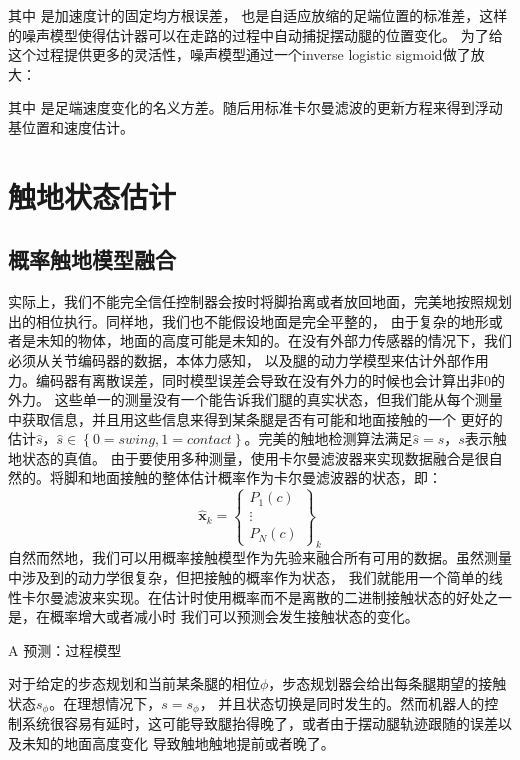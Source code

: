 其中 是加速度计的固定均方根误差， 也是自适应放缩的足端位置的标准差，这样的噪声模型使得估计器可以在走路的过程中自动捕捉摆动腿的位置变化。
为了给这个过程提供更多的灵活性，噪声模型通过一个inverse logistic sigmoid做了放大：

其中 是足端速度变化的名义方差。随后用标准卡尔曼滤波的更新方程来得到浮动基位置和速度估计。

\section{触地状态估计}
\subsection{概率触地模型融合}
实际上，我们不能完全信任控制器会按时将脚抬离或者放回地面，完美地按照规划出的相位执行。同样地，我们也不能假设地面是完全平整的，
由于复杂的地形或者是未知的物体，地面的高度可能是未知的。在没有外部力传感器的情况下，我们必须从关节编码器的数据，本体力感知，
以及腿的动力学模型来估计外部作用力。编码器有离散误差，同时模型误差会导致在没有外力的时候也会计算出非0的外力。
这些单一的测量没有一个能告诉我们腿的真实状态，但我们能从每个测量中获取信息，并且用这些信息来得到某条腿是否有可能和地面接触的一个
更好的估计$\hat s$，$\hat s \in \left\{0=swing, 1=contact\right\}$。完美的触地检测算法满足$\hat s = s$，$s$表示触地状态的真值。
由于要使用多种测量，使用卡尔曼滤波器来实现数据融合是很自然的。将脚和地面接触的整体估计概率作为卡尔曼滤波器的状态，即：
\begin{equation}
    \label{equ:est_state}
    \hat{\boldsymbol{x}}_k=\left\{\begin{array}{c}
        P_1(c) \\
        \vdots \\
        P_N(c)
        \end{array}\right\}_k
\end{equation}
自然而然地，我们可以用概率接触模型作为先验来融合所有可用的数据。虽然测量中涉及到的动力学很复杂，但把接触的概率作为状态，
我们就能用一个简单的线性卡尔曼滤波来实现。在估计时使用概率而不是离散的二进制接触状态的好处之一是，在概率增大或者减小时
我们可以预测会发生接触状态的变化。

A 预测：过程模型

对于给定的步态规划和当前某条腿的相位$\phi$，步态规划器会给出每条腿期望的接触状态$s_{\phi}$。在理想情况下，$s = s_{\phi}$，
并且状态切换是同时发生的。然而机器人的控制系统很容易有延时，这可能导致腿抬得晚了，或者由于摆动腿轨迹跟随的误差以及未知的地面高度变化
导致触地触地提前或者晚了。

